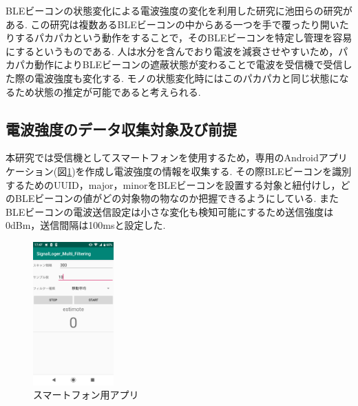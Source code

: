 \documentclass[Japanese]{dicomopapers}
\begin{document}
BLEビーコンの状態変化による電波強度の変化を利用した研究に池田ら\cite{BLEpkpk}の研究がある.
この研究は複数あるBLEビーコンの中からある一つを手で覆ったり開いたりするパカパカという動作をすることで，そのBLEビーコンを特定し管理を容易にするというものである.
人は水分を含んでおり電波を減衰させやすいため，パカパカ動作によりBLEビーコンの遮蔽状態が変わることで電波を受信機で受信した際の電波強度も変化する.
モノの状態変化時にはこのパカパカと同じ状態になるため状態の推定が可能であると考えられる.





\subsection{電波強度のデータ収集対象及び前提}

本研究では受信機としてスマートフォンを使用するため，専用のAndroidアプリケーション(図\ref{phoneApp})を作成し電波強度の情報を収集する.
その際BLEビーコンを識別するためのUUID，major，minorをBLEビーコンを設置する対象と紐付けし，どのBLEビーコンの値がどの対象物の物なのか把握できるようにしている.
またBLEビーコンの電波送信設定は小さな変化も検知可能にするため送信強度は0dBm，送信間隔は100msと設定した.

\begin{figure}[ht]
    \centering
    \includegraphics[height=5.5cm]{application.jpg}
    \caption{スマートフォン用アプリ}
    \label{phoneApp}
\end{figure}




\end{document}
